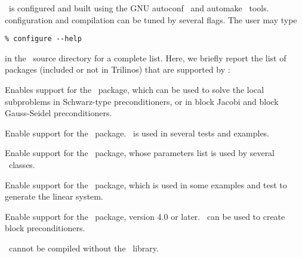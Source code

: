 \ifpack\ is configured and built using the GNU autoconf~\cite{Autoconf} and
automake~\cite{Automake} tools. 
\ifpack configuration and compilation can be tuned by several flags.
The user may type 
\begin{verbatim}
% configure --help
\end{verbatim}
in the \ifpack\ source directory for a complete list. Here, we briefly report
the list of packages (included or not in Trilinos) that are supported 
by \ifpack:

\medskip

{Enables support for the \amesos~package, which can be used to solve the
  local subproblems in Schwarz-type preconditioners, or in
    block Jacobi and block Gauss-Seidel preconditioners.}

{Enable support for the \aztecoo\ package. \aztecoo~is used in several tests
  and examples.}

{Enable support for the \teuchos\ package, whose parameters list is used by
  several \ifpack\ classes.}

{Enable support for the \triutils\ package, which is used in some examples and
  test to generate the linear system.}

{Enable support for the \metis\ package, version 4.0 or later. \metis\ can be
  used to create block preconditioners.}

\begin{remark}
\ifpack\ cannot be compiled without the \epetra\ library.
\end{remark}
